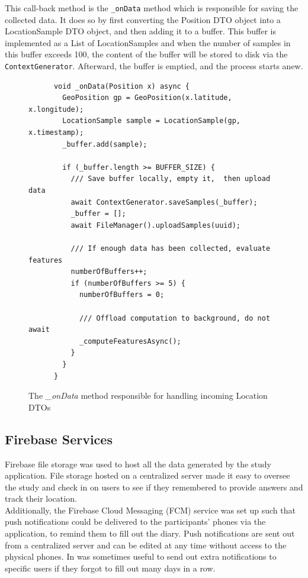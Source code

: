 This call-back method is the \verb|_onData| method which is responsible for saving the collected data. It does so by first converting the Position DTO object into a LocationSample DTO object, and then adding it to a buffer. This buffer is implemented as a List of LocationSamples and when the number of samples in this buffer exceeds 100, the content of the buffer will be stored to disk via the \verb|ContextGenerator|. Afterward, the buffer is emptied, and the process starts anew. 

\begin{figure}
    \centering
    \begin{verbatim}
      void _onData(Position x) async {
        GeoPosition gp = GeoPosition(x.latitude, x.longitude);
        LocationSample sample = LocationSample(gp, x.timestamp);
        _buffer.add(sample);

        if (_buffer.length >= BUFFER_SIZE) {
          /// Save buffer locally, empty it,  then upload data
          await ContextGenerator.saveSamples(_buffer);
          _buffer = [];
          await FileManager().uploadSamples(uuid);
    
          /// If enough data has been collected, evaluate features
          numberOfBuffers++;
          if (numberOfBuffers >= 5) {
            numberOfBuffers = 0;
    
            /// Offload computation to background, do not await
            _computeFeaturesAsync();
          }
        }
      }
    \end{verbatim}
    \caption{The \textit{\_onData} method responsible for handling incoming Location DTOs}
    \label{fig:ondata-method}
\end{figure}


\subsection{Firebase Services}
Firebase file storage was used to host all the data generated by the study application. File storage hosted on a centralized server made it easy to oversee the study and check in on users to see if they remembered to provide answers and track their location. \\

Additionally, the Firebase Cloud Messaging (FCM) service was set up such that push notifications could be delivered to the participants' phones via the application, to remind them to fill out the diary. Push notifications are sent out from a centralized server and can be edited at any time without access to the physical phones. In was sometimes useful to send out extra notifications to specific users if they forgot to fill out many days in a row.

